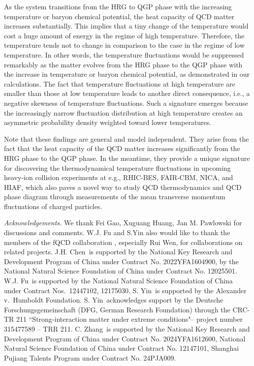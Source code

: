 \documentclass[aps,twocolumn,prd,superscriptaddress,nofootinbib,floatfix]{revtex4-2}
\begin{document}
As the system transitions from the HRG to QGP phase with the increasing temperature or baryon chemical potential, the heat capacity of QCD matter increases substantially. This implies that a tiny change of the temperature would cost a huge amount of energy in the regime of high temperature. Therefore, the temperature tends not to change in comparison to the case in the regime of low temperature. In other words, the temperature fluctuations would be suppressed remarkably as the matter evolves from the HRG phase to the QGP phase with the increase in temperature or baryon chemical potential, as demonstrated in our calculations. The fact that temperature fluctuations at high temperature are smaller than those at low temperature leads to another direct consequence, i.e., a negative skewness of temperature fluctuations. Such a signature emerges because the increasingly narrow fluctuation distribution at high temperature creates an asymmetric probability density weighted toward lower temperatures. 

Note that these findings are general and model independent. They arise from the fact that the heat capacity of the QCD matter increases significantly from the HRG phase to the QGP phase. In the meantime, they provide a unique signature for discovering the thermodynamical temperature fluctuations in upcoming heavy-ion collision experiments at e.g., RHIC-BES, FAIR-CBM, NICA, and HIAF, which also paves a novel way to study QCD thermodynamics and QCD phase diagram through measurements of the mean transverse momentum fluctuations of charged particles.


\textit{Acknowledgements.} We thank Fei Gao,  Xuguang Huang, Jan M. Pawlowski for discussions and comments. W.J. Fu and S.Yin also would like to thank the members of the fQCD collaboration \cite{fQCD}, especially Rui Wen, for collaborations on related projects.
J.H. Chen\ is supported by the National Key Research and Development Program of China under Contract No. 2022YFA1604900, by the National Natural Science Foundation of China under Contract No. 12025501.
W.J. Fu\ is supported by the National Natural Science Foundation of China under Contract Nos.\ 12447102, 12175030. 
S. Yin\ is supported by the Alexander v.\ Humboldt Foundation. 
S. Yin\ acknowledges support by the Deutsche Forschungsgemeinschaft (DFG, German Research Foundation) through the CRC-TR 211 ``Strong-interaction matter under extreme conditions"– project number 315477589 – TRR 211.
C. Zhang\ is supported by the National Key Research and Development Program of China under Contract No. 2024YFA1612600, National Natural Science Foundation of China under Contract No. 12147101, Shanghai Pujiang Talents Program under Contract No. 24PJA009.
\end{document}
